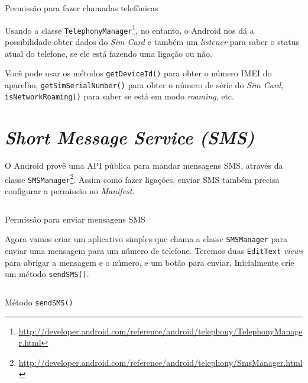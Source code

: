 \documentclass[a4paper,12pt,brazil,oneside]{book}
\begin{document}
		\begin{listing}[H]
		\inputminted[linenos=true,fontsize=\small,frame=lines, framesep=2mm, tabsize=2,numbersep=5pt]{xml}{src/api/comm/phonecall-perm.xml}
		\caption{Permissão para fazer chamadas telefônicas}
		\label{code:phonecall-perm}
		\end{listing} 		

		Usando a classe \texttt{TelephonyManager}\footnote{\href{http://developer.android.com/reference/android/telephony/TelephonyManager.html}{http://developer.android.com/reference/android/telephony/TelephonyManager.html}}, no entanto, o Android nos dá a possibilidade obter dados do \emph{Sim Card} e também um \emph{listener} para saber o status atual do telefone, se ele está fazendo uma ligação ou não.

		Você pode usar os métodos \texttt{getDeviceId()} para obter o número IMEI do aparelho, \texttt{getSimSerialNumber()} para obter o número de série do \emph{Sim Card}, \texttt{isNetworkRoaming()} para saber se está em modo \emph{roaming}, etc.

	\section{\emph{Short Message Service (SMS)}}

		O Android provê uma API pública para mandar mensagens SMS, através da classe \texttt{SMSManager}\footnote{\href{http://developer.android.com/reference/android/telephony/SmsManager.html}{http://developer.android.com/reference/android/telephony/SmsManager.html}}. Assim como fazer ligações, enviar SMS também precisa configurar a permissão no \emph{Manifest}.

		\begin{listing}[H]
		\inputminted[linenos=true,fontsize=\small,frame=lines, framesep=2mm, tabsize=2,numbersep=5pt]{xml}{src/api/comm/sms-perm.xml}
		\caption{Permissão para enviar mensagens SMS}
		\label{code:sms-perm}
		\end{listing} 	

		Agora vamos criar um aplicativo simples que chama a classe \texttt{SMSManager} para enviar uma mensagem para um número de telefone. Teremos duas \texttt{EditText} \emph{views} para abrigar a mensagem e o número, e um botão para enviar. Inicialmente crie um método \texttt{sendSMS()}.

		\begin{listing}[H]
		\inputminted[linenos=true,fontsize=\small,frame=lines, framesep=2mm, tabsize=2,numbersep=5pt]{java}{src/api/comm/sendsms.java}
		\caption{Método \texttt{sendSMS()}}
		\label{code:sendsms}
		\end{listing} 	
	
\end{document}
